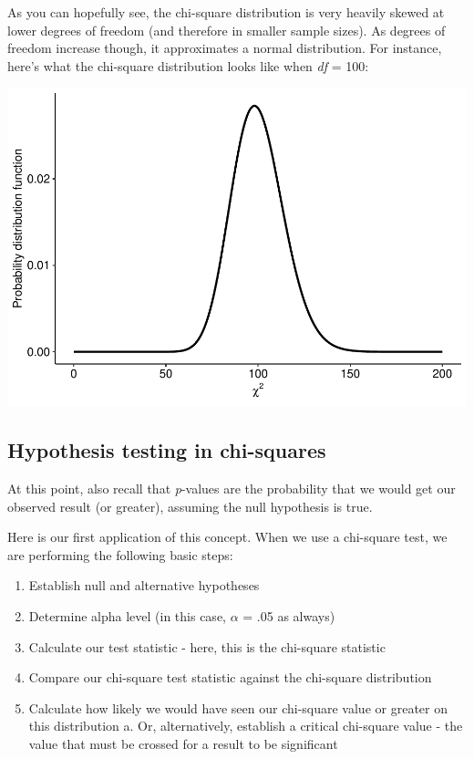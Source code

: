 \documentclass[
]{book}
\providecommand{\tightlist}{%
  \setlength{\itemsep}{0pt}\setlength{\parskip}{0pt}}
\begin{document}
As you can hopefully see, the chi-square distribution is very heavily skewed at lower degrees of freedom (and therefore in smaller sample sizes). As degrees of freedom increase though, it approximates a normal distribution. For instance, here's what the chi-square distribution looks like when \emph{df} = 100:

\includegraphics{_main_files/figure-latex/unnamed-chunk-97-1.pdf}

\hypertarget{hypothesis-testing-in-chi-squares}{%
\subsection{Hypothesis testing in chi-squares}\label{hypothesis-testing-in-chi-squares}}

At this point, also recall that \emph{p}-values are the probability that we would get our observed result (or greater), assuming the null hypothesis is true.

Here is our first application of this concept. When we use a chi-square test, we are performing the following basic steps:

\begin{enumerate}
\def\labelenumi{\arabic{enumi}.}
\tightlist
\item
  Establish null and alternative hypotheses
\item
  Determine alpha level (in this case, \(\alpha\) = .05 as always)
\item
  Calculate our test statistic - here, this is the chi-square statistic
\item
  Compare our chi-square test statistic against the chi-square distribution
\item
  Calculate how likely we would have seen our chi-square value or greater on this distribution
  a. Or, alternatively, establish a critical chi-square value - the value that must be crossed for a result to be significant
\end{enumerate}
\end{document}
